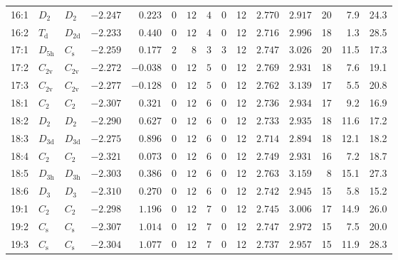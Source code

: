 \begin{table}[htbp]
{\begin{tabular}{lllrrrrrrrrrrrr}
16:1    & $D_\mathrm{2}$  & $D_\mathrm{2 }$ & $-2.247$ & $0.223$  & $0$ & $12$ & $4$      & $0$ & 12  & $2.770$ & $2.917$ & 20  & 7.9  & 24.3  \\
16:2    & $T_\mathrm{d}$  & $D_\mathrm{2d}$ & $-2.233$ & $0.440$  & $0$ & $12$ & $4$      & $0$ & 12  & $2.716$ & $2.996$ & 18  & 1.3  & 28.5  \\
17:1    & $D_\mathrm{5h}$ & $C_\mathrm{s}$    & $-2.259$ & $0.177$  & $2$ & $8$  & $3$      & $3$ & 12  & $2.747$ & $3.026$ & 20  & 11.5 & 17.3  \\
17:2    & $C_\mathrm{2v}$ & $C_\mathrm{2v}$ & $-2.272$ & $-0.038$ & $0$ & $12$ & $5$      & $0$ & 12  & $2.769$ & $2.931$ & 18  & 7.6  & 19.1  \\
17:3    & $C_\mathrm{2v}$ & $C_\mathrm{2v}$ & $-2.277$ & $-0.128$ & $0$ & $12$ & $5$      & $0$ & 12  & $2.762$ & $3.139$ & 17  & 5.5  & 20.8  \\
18:1    & $C_\mathrm{2}$  & $C_\mathrm{2 }$ & $-2.307$ & $0.321$  & $0$ & $12$ & $6$      & $0$ & 12  & $2.736$ & $2.934$ & 17  & 9.2  & 16.9  \\
18:2    & $D_\mathrm{2}$  & $D_\mathrm{2 }$ & $-2.290$ & $0.627$  & $0$ & $12$ & $6$      & $0$ & 12  & $2.733$ & $2.935$ & 18  & 11.6 & 17.2  \\
18:3    & $D_\mathrm{3d}$ & $D_\mathrm{3d}$ & $-2.275$ & $0.896$  & $0$ & $12$ & $6$      & $0$ & 12  & $2.714$ & $2.894$ & 18  & 12.1 & 18.2  \\
18:4    & $C_\mathrm{2}$  & $C_\mathrm{2 }$ & $-2.321$ & $0.073$  & $0$ & $12$ & $6$      & $0$ & 12  & $2.749$ & $2.931$ & 16  & 7.2  & 18.7  \\
18:5    & $D_\mathrm{3h}$ & $D_\mathrm{3h}$ & $-2.303$ & $0.386$  & $0$ & $12$ & $6$      & $0$ & 12  & $2.763$ & $3.159$ & 8   & 15.1 & 27.3  \\
18:6    & $D_\mathrm{3}$  & $D_\mathrm{3 }$ & $-2.310$ & $0.270$  & $0$ & $12$ & $6$      & $0$ & 12  & $2.742$ & $2.945$ & 15  & 5.8  & 15.2  \\
19:1    & $C_\mathrm{2}$  & $C_\mathrm{2 }$ & $-2.298$ & $1.196$  & $0$ & $12$ & $7$      & $0$ & 12  & $2.745$ & $3.006$ & 17  & 14.9 & 26.0  \\
19:2    & $C_\mathrm{s}$  & $C_\mathrm{s }$ & $-2.307$ & $1.014$  & $0$ & $12$ & $7$      & $0$ & 12  & $2.747$ & $2.972$ & 15  & 7.5  & 20.0  \\
19:3    & $C_\mathrm{s}$  & $C_\mathrm{s }$ & $-2.304$ & $1.077$  & $0$ & $12$ & $7$      & $0$ & 12  & $2.737$ & $2.957$ & 15  & 11.9 & 28.3  \\

\end{tabular}}
\end{table}
